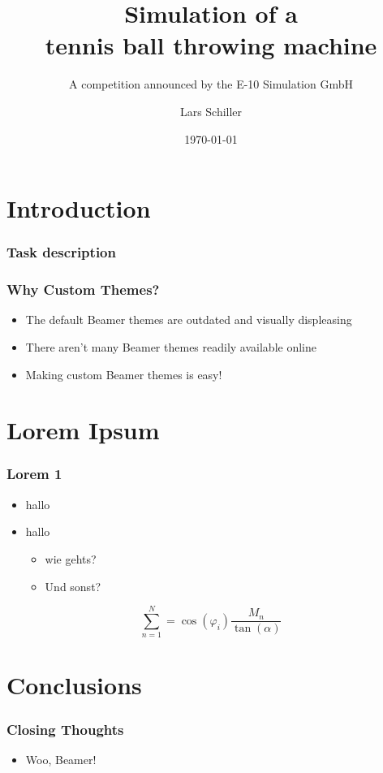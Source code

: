 \documentclass{beamer}
\title{Simulation of a \\ \vspace{.4cm} tennis ball throwing machine}
\subtitle{A competition announced by the E-10 Simulation GmbH }
\author{Lars Schiller}
\date{\today}
\begin{document}
	\setcounter{showProgressBar}{0}
	\setcounter{showSlideNumbers}{0}

	\frame{\titlepage}

	\setcounter{framenumber}{0}
	\setcounter{showProgressBar}{1}
	\setcounter{showSlideNumbers}{1}
	
	
	
	
	\section{Introduction}
		\begin{frame}
			\frametitle{Task description}
		
		
		
		\end{frame}

		\begin{frame}
			\frametitle{Why Custom Themes?}
			\begin{itemize}
				\item The default Beamer themes are outdated and visually displeasing
				\item There aren't many Beamer themes readily available online
				\item Making custom Beamer themes is easy!
			\end{itemize}
		\end{frame}

	\section{Lorem Ipsum}
		\begin{frame}
			\frametitle{Lorem 1}
			\begin{itemize}
			\item hallo
			\item hallo
				\begin{itemize}
					\item wie gehts?
					\item Und sonst?
				\end{itemize}
			\end{itemize}
			\begin{equation}
				\sum\limits_{n=1}^N = \cos(\varphi_i)\frac{M_n}{\tan(\alpha)}
			\end{equation}
		\end{frame}


	\section{Conclusions}
		\begin{frame}
			\frametitle{Closing Thoughts}
			\begin{itemize}
				\item Woo, Beamer!
			\end{itemize}
		\end{frame}
\end{document}
